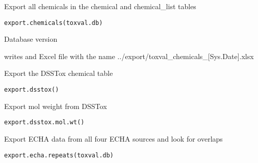 \documentclass[letterpaper]{book}
\begin{document}
%
\begin{Description}\relax
Export all chemicals in the chemical and chemical\_list tables
\end{Description}
%
\begin{Usage}
\begin{verbatim}
export.chemicals(toxval.db)
\end{verbatim}
\end{Usage}
%
\begin{Arguments}
\begin{ldescription}
\item[\code{toxval.db}] Database version
\end{ldescription}
\end{Arguments}
%
\begin{Value}
writes and Excel file with the name
../export/toxval\_chemicals\_[Sys.Date].xlsx
\end{Value}
%
\begin{Description}\relax
Export the DSSTox chemical table
\end{Description}
%
\begin{Usage}
\begin{verbatim}
export.dsstox()
\end{verbatim}
\end{Usage}
%
\begin{Description}\relax
Export mol weight from DSSTox
\end{Description}
%
\begin{Usage}
\begin{verbatim}
export.dsstox.mol.wt()
\end{verbatim}
\end{Usage}
%
\begin{Description}\relax
Export ECHA data from all four ECHA sources and look for overlaps
\end{Description}
%
\begin{Usage}
\begin{verbatim}
export.echa.repeats(toxval.db)
\end{verbatim}
\end{Usage}
\end{document}

